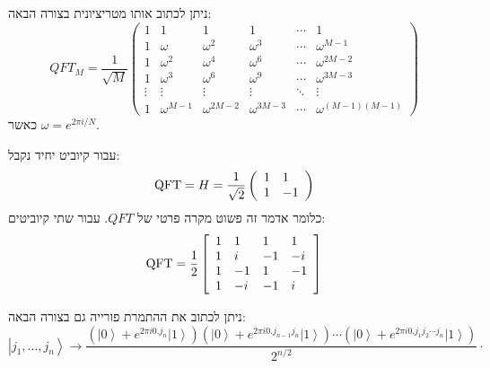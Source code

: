 \documentclass{tstextbook}
\begin{document}
\begin{proposition}
ניתן לכתוב אותו מטריציונית בצורה הבאה:
$$QFT_{M}={\frac{1}{\sqrt{M}}}\begin{pmatrix}1&1&1&1&\cdots&1\\ 1&\omega&\omega^{2}&\omega^{3}&\cdots&\omega^{M-1}\\ 1&\omega^{2}&\omega^{4}&\omega^{6}&\cdots&\omega^{2M-2}\\ 1&\omega^{3}&\omega^{6}&\omega^{9}&\cdots&\omega^{3M-3}\\ \vdots&\vdots&\vdots&\vdots&\ddots&\vdots\\ 1&\omega^{M-1}&\omega^{2M-2}&\omega^{3M-3}&\cdots&\omega^{(M-1)(M-1)}\end{pmatrix}$$
כאשר \(\omega=e^{ 2\pi i/N }\).

\end{proposition}
\begin{example}
עבור קיוביט יחיד נקבל:
$$\mathrm{QFT}=H={\frac{1}{\sqrt{2}}}\left({\begin{array}{l l}{1}&{1}\\ {1}&{-1}\end{array}}\right)$$
כלומר אדמר זה פשוט מקרה פרטי של \(QFT\). עבור שתי קיוביטים:
$$\mathrm{QFT}={\frac{1}{2}}\left[{\begin{array}{l l l l}{1}&{1}&{1}&{1}\\ {1}&{i}&{-1}&{-i}\\ {1}&{-1}&{1}&{-1}\\ {1}&{-i}&{-1}&{i}\end{array}}\right]$$

\end{example}
\begin{lemma}
ניתן לכתוב את ההתמרת פורייה גם בצורה הבאה:
$$\left|j_{1},\ldots,j_{n}\right\rangle\rightarrow\frac{\left(\left|0\right\rangle+e^{2\pi i0.j_{n}}\left|1\right\rangle\right)\left(\left|0\right\rangle+e^{2\pi i0.j_{n-1}j_{n}}\left|1\right\rangle\right)\cdots\left(\left|0\right\rangle+e^{2\pi i0.j_{1}j_{2}\cdots j_{n}}\left|1\right\rangle\right)}{2^{n/2}}\cdot$$

\end{lemma}
\end{document}

